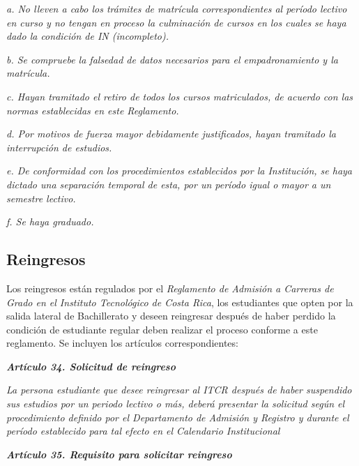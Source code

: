 \textit{a. No lleven a cabo los trámites de matrícula correspondientes al período lectivo en curso y no tengan en proceso la culminación de cursos en los cuales se haya dado la condición de IN (incompleto). }\par

\textit{b. Se compruebe la falsedad de datos necesarios para el empadronamiento y la matrícula.          }\par

\textit{c. Hayan tramitado el retiro de todos los cursos matriculados, de acuerdo con las normas establecidas en este Reglamento.   }\par

\textit{d. Por motivos de fuerza mayor debidamente justificados, hayan tramitado la interrupción de estudios.     }\par

\textit{e. De conformidad con los procedimientos establecidos por la Institución, se haya dictado una separación temporal de esta, por un período igual o mayor a un semestre lectivo.   }\par

\textit{f. Se haya graduado. }\par

\subsection*{Reingresos}

Los reingresos están regulados por el \textit{R}\textit{eglamento de Admisión a Carreras de Grado en el Instituto Tecnológico de Costa Rica}, los estudiantes que opten por la salida lateral de Bachillerato y deseen reingresar después de haber perdido la condición de estudiante regular deben realizar el proceso conforme a este reglamento. Se incluyen los artículos correspondientes:\par

\textit{\textbf{Artículo 34.  Solicitud de reingreso  }}\par

\textit{La persona estudiante que desee reingresar al ITCR después de haber suspendido sus estudios por un periodo lectivo o más, deberá presentar la solicitud según el procedimiento definido por el Departamento de Admisión y Registro y durante el período establecido para tal efecto en el Calendario Institucional }\par

\textit{\textbf{Artículo 35. Requisito para solicitar reingreso }}\par

